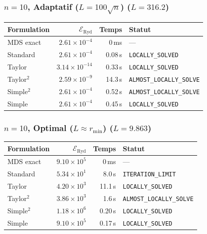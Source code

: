\subsubsection{$n=10$, Adaptatif ($L{=}100\sqrt{n}$) ($L=316.2$)}
\begin{longtable}{@{}lrrl@{}}
  \toprule
  Formulation & $\mathcal{E}_{\mathrm{Ryd}}$ & Temps & Statut \\
  \midrule
  \endhead
  MDS exact & $2.61\times10^{-4}$ & 0\,ms & --- \\
  Standard & $2.61\times10^{-4}$ & 0.08\,s & \texttt{LOCALLY\_SOLVED} \\
  Taylor & $3.14\times10^{-14}$ & 0.33\,s & \texttt{LOCALLY\_SOLVED} \\
  Taylor$^2$ & $2.59\times10^{-9}$ & 14.3\,s & \texttt{ALMOST\_LOCALLY\_SOLVE} \\
  Simple$^2$ & $2.61\times10^{-4}$ & 0.52\,s & \texttt{ALMOST\_LOCALLY\_SOLVE} \\
  Simple & $2.61\times10^{-4}$ & 0.45\,s & \texttt{LOCALLY\_SOLVED} \\
  \bottomrule
\end{longtable}

\subsubsection{$n=10$, Optimal ($L{\approx}r_{\min}$) ($L=9.863$)}
\begin{longtable}{@{}lrrl@{}}
  \toprule
  Formulation & $\mathcal{E}_{\mathrm{Ryd}}$ & Temps & Statut \\
  \midrule
  \endhead
  MDS exact & $9.10\times10^{5}$ & 0\,ms & --- \\
  Standard & $5.34\times10^{1}$ & 8.0\,s & \texttt{ITERATION\_LIMIT} \\
  Taylor & $4.20\times10^{3}$ & 11.1\,s & \texttt{LOCALLY\_SOLVED} \\
  Taylor$^2$ & $3.86\times10^{3}$ & 1.6\,s & \texttt{ALMOST\_LOCALLY\_SOLVE} \\
  Simple$^2$ & $1.18\times10^{6}$ & 0.20\,s & \texttt{LOCALLY\_SOLVED} \\
  Simple & $9.10\times10^{5}$ & 0.17\,s & \texttt{LOCALLY\_SOLVED} \\
  \bottomrule
\end{longtable}

